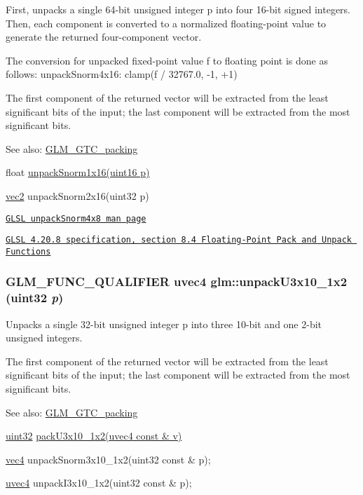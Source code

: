 First, unpacks a single 64-bit unsigned integer p into four 16-bit signed integers. Then, each component is converted to a normalized floating-point value to generate the returned four-component vector.

The conversion for unpacked fixed-point value f to floating point is done as follows: unpackSnorm4x16: clamp(f / 32767.0, -1, +1)

The first component of the returned vector will be extracted from the least significant bits of the input; the last component will be extracted from the most significant bits.

\begin{Desc}
\item[See also:]\hyperlink{group__gtc__packing}{GLM\_\-GTC\_\-packing} 

float \hyperlink{group__gtc__packing_g246f451cebf590726324f7a283e3d65e}{unpackSnorm1x16(uint16 p)} 

\hyperlink{group__core__types_ga1618f51db67eaa145db101d8c8431d8}{vec2} unpackSnorm2x16(uint32 p) 

\href{http://www.opengl.org/sdk/docs/manglsl/xhtml/unpackSnorm2x16.xml}{\tt GLSL unpackSnorm4x8 man page} 

\href{http://www.opengl.org/registry/doc/GLSLangSpec.4.20.8.pdf}{\tt GLSL 4.20.8 specification, section 8.4 Floating-Point Pack and Unpack Functions} \end{Desc}
\hypertarget{group__gtc__packing_g119aa2d7d55952f9dc4214390a6ffefc}{
\subsubsection[unpackU3x10\_\-1x2]{\setlength{\rightskip}{0pt plus 5cm}GLM\_\-FUNC\_\-QUALIFIER uvec4 glm::unpackU3x10\_\-1x2 (uint32 {\em p})}}
\label{group__gtc__packing_g119aa2d7d55952f9dc4214390a6ffefc}


Unpacks a single 32-bit unsigned integer p into three 10-bit and one 2-bit unsigned integers.

The first component of the returned vector will be extracted from the least significant bits of the input; the last component will be extracted from the most significant bits.

\begin{Desc}
\item[See also:]\hyperlink{group__gtc__packing}{GLM\_\-GTC\_\-packing} 

\hyperlink{group__gtc__type__precision_g202b6a53c105fcb7e531f9b443518451}{uint32} \hyperlink{group__gtc__packing_gf656d8862628f96b20de7a36eaa1fe56}{packU3x10\_\-1x2(uvec4 const \& v)} 

\hyperlink{group__core__types_g5881b1b022d7fd1b7218f5916532dd02}{vec4} unpackSnorm3x10\_\-1x2(uint32 const \& p); 

\hyperlink{group__core__types_g1c426d19627b32b14f0089f7f4ba7b1d}{uvec4} unpackI3x10\_\-1x2(uint32 const \& p); \end{Desc}


